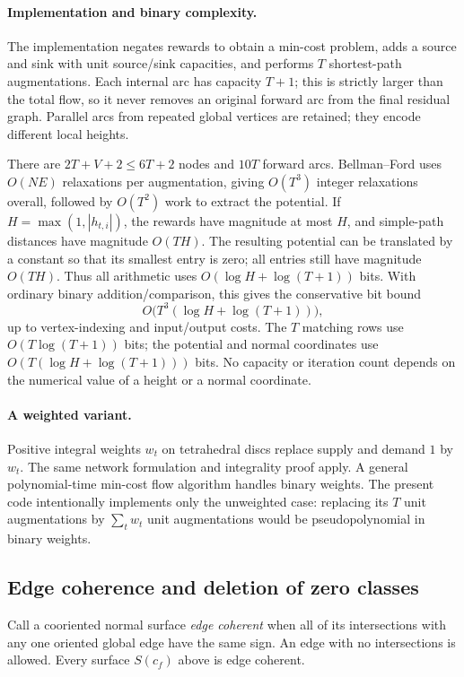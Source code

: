 \paragraph{Implementation and binary complexity.}
The implementation negates rewards to obtain a min-cost problem, adds a
source and sink with unit source/sink capacities, and performs $T$
shortest-path augmentations. Each internal arc has capacity $T+1$; this is
strictly larger than the total flow, so it never removes an original
forward arc from the final residual graph. Parallel arcs from repeated
global vertices are retained; they encode different local heights.

There are $2T+V+2\leq6T+2$ nodes and $10T$ forward arcs. Bellman--Ford
uses $O(NE)$ relaxations per augmentation, giving $O(T^3)$ integer
relaxations overall, followed by $O(T^2)$ work to extract the potential.
If $H=\max(1,|h_{t,i}|)$, the rewards have magnitude at most $H$, and
simple-path distances have magnitude $O(TH)$. The resulting potential can
be translated by a constant so that its smallest entry is zero; all entries
still have magnitude $O(TH)$. Thus all arithmetic uses
$O(\log H+\log(T+1))$ bits. With ordinary binary addition/comparison, this
gives the conservative bit bound
\[
 O\bigl(T^3(\log H+\log(T+1))\bigr),
\]
up to vertex-indexing and input/output costs. The $T$ matching rows use
$O(T\log(T+1))$ bits; the potential and normal coordinates use
$O(T(\log H+\log(T+1)))$ bits. No capacity or iteration count depends on
the numerical value of a height or a normal coordinate.

\paragraph{A weighted variant.}
Positive integral weights $w_t$ on tetrahedral discs replace supply and
demand $1$ by $w_t$. The same network formulation and integrality proof
apply. A general polynomial-time min-cost flow algorithm handles binary
weights. The present code intentionally implements only the unweighted
case: replacing its $T$ unit augmentations by $\sum_t w_t$ unit
augmentations would be pseudopolynomial in binary weights.

\subsection{Edge coherence and deletion of zero classes}

Call a cooriented normal surface \emph{edge coherent} when all of its
intersections with any one oriented global edge have the same sign. An
edge with no intersections is allowed. Every surface $S(c_f)$ above is
edge coherent.

